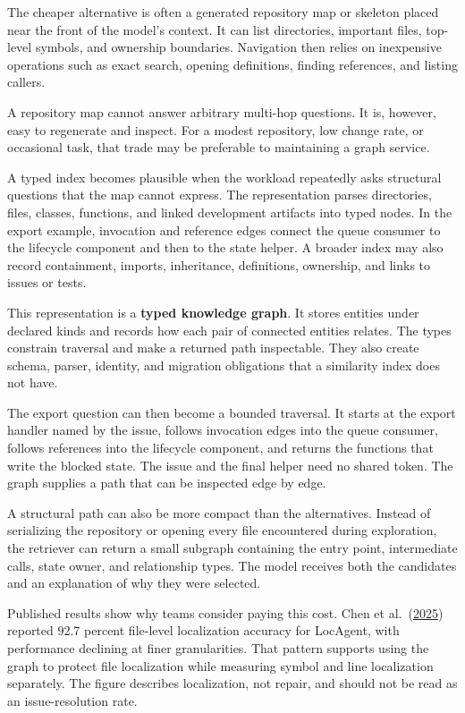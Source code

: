 The cheaper alternative is often a generated repository map or skeleton placed near the front of the model's context. It can list directories, important files, top-level symbols, and ownership boundaries. Navigation then relies on inexpensive operations such as exact search, opening definitions, finding references, and listing callers.

A repository map cannot answer arbitrary multi-hop questions. It is, however, easy to regenerate and inspect. For a modest repository, low change rate, or occasional task, that trade may be preferable to maintaining a graph service.

A typed index becomes plausible when the workload repeatedly asks structural questions that the map cannot express. The representation parses directories, files, classes, functions, and linked development artifacts into typed nodes. In the export example, invocation and reference edges connect the queue consumer to the lifecycle component and then to the state helper. A broader index may also record containment, imports, inheritance, definitions, ownership, and links to issues or tests.

This representation is a \textbf{typed knowledge graph}. It stores entities under declared kinds and records how each pair of connected entities relates. The types constrain traversal and make a returned path inspectable. They also create schema, parser, identity, and migration obligations that a similarity index does not have.

The export question can then become a bounded traversal. It starts at the export handler named by the issue, follows invocation edges into the queue consumer, follows references into the lifecycle component, and returns the functions that write the blocked state. The issue and the final helper need no shared token. The graph supplies a path that can be inspected edge by edge.

A structural path can also be more compact than the alternatives. Instead of serializing the repository or opening every file encountered during exploration, the retriever can return a small subgraph containing the entry point, intermediate calls, state owner, and relationship types. The model receives both the candidates and an explanation of why they were selected.

Published results show why teams consider paying this cost. Chen et al.~(\href{https://arxiv.org/abs/2503.09089}{2025}) reported 92.7 percent file-level localization accuracy for LocAgent, with performance declining at finer granularities. That pattern supports using the graph to protect file localization while measuring symbol and line localization separately. The figure describes localization, not repair, and should not be read as an issue-resolution rate.


